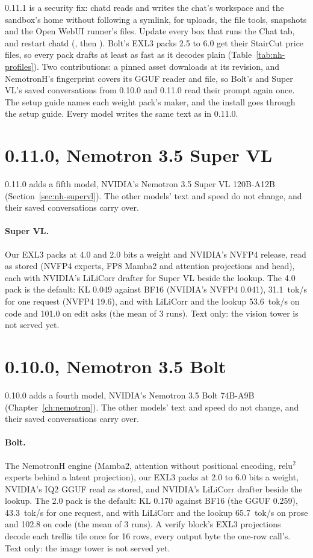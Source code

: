 0.11.1 is a security fix: chatd reads and writes the chat's workspace and the sandbox's home without following a symlink, for uploads, the file tools, snapshots and the Open WebUI runner's files. Update every box that runs the Chat tab, and restart chatd (, then ). Bolt's EXL3 packs 2.5 to 6.0 get their StairCut price files, so every pack drafts at least as fast as it decodes plain (Table~\ref{tab:nh-profiles}). Two contributions: a pinned asset downloads at its revision, and NemotronH's fingerprint covers its GGUF reader and file, so Bolt's and Super VL's saved conversations from 0.10.0 and 0.11.0 read their prompt again once. The setup guide names each weight pack's maker, and the install goes through the setup guide. Every model writes the same text as in 0.11.0.

\section{0.11.0, Nemotron 3.5 Super VL}\label{sec:changelog-0110}

0.11.0 adds a fifth model, NVIDIA's Nemotron 3.5 Super VL 120B-A12B (Section~\ref{sec:nh-supervl}). The other models' text and speed do not change, and their saved conversations carry over.

\paragraph{Super VL.} Our EXL3 packs at 4.0 and 2.0 bits a weight and NVIDIA's NVFP4 release, read as stored (NVFP4 experts, FP8 Mamba2 and attention projections and head), each with NVIDIA's LiLiCorr drafter for Super VL beside the lookup. The 4.0 pack is the default: KL 0.049 against BF16 (NVIDIA's NVFP4 0.041), 31.1~tok/s for one request (NVFP4 19.6), and with LiLiCorr and the lookup 53.6~tok/s on code and 101.0 on edit asks (the mean of 3 runs). Text only: the vision tower is not served yet.

\section{0.10.0, Nemotron 3.5 Bolt}\label{sec:changelog-0100}

0.10.0 adds a fourth model, NVIDIA's Nemotron 3.5 Bolt 74B-A9B (Chapter~\ref{ch:nemotron}). The other models' text and speed do not change, and their saved conversations carry over.

\paragraph{Bolt.} The NemotronH engine (Mamba2, attention without positional encoding, relu$^2$ experts behind a latent projection), our EXL3 packs at 2.0 to 6.0 bits a weight, NVIDIA's IQ2 GGUF read as stored, and NVIDIA's LiLiCorr drafter beside the lookup. The 2.0 pack is the default: KL 0.170 against BF16 (the GGUF 0.259), 43.3~tok/s for one request, and with LiLiCorr and the lookup 65.7~tok/s on prose and 102.8 on code (the mean of 3 runs). A verify block's EXL3 projections decode each trellis tile once for 16 rows, every output byte the one-row call's. Text only: the image tower is not served yet.

